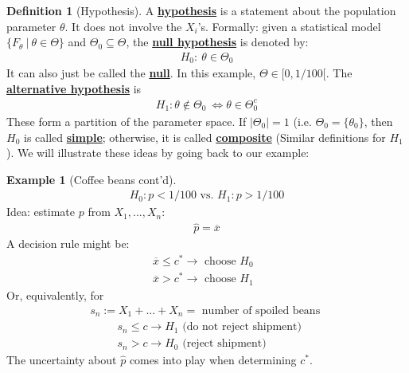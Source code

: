 \documentclass[11pt]{scrartcl}
\theoremstyle{definition}
\newtheorem{definition}{Definition}
\newtheorem{ex}{Example}
\theoremstyle{remark}
\newcommand{\dfn}[1]{\textbf{\underline{#1}}}
\begin{document}
{\begin{definition}[Hypothesis]
	A \dfn{hypothesis} is a statement about the population parameter $\theta$. It does not involve the $X_i$'s. Formally: given a statistical model $\{ F_\theta\ |\ \theta \in \Theta \}$ and $\Theta_0 \subseteq \Theta$, the \dfn{null hypothesis} is denoted by: 
	\begin{align*}
		H_0:\ \theta \in \Theta_0 
	\end{align*}
	It can also just be called the \dfn{null}. In this example, $\Theta \in [0, 1/100[$. The \dfn{alternative hypothesis} is 
	\begin{align*}
		H_1: \theta \notin \Theta_0\ \iff \theta \in \Theta_0^c 
	\end{align*}
	These form a partition of the parameter space. If $| \Theta_0 | =1$ (i.e. $\Theta_0 = \{ \theta_0 \}$, then $H_0$ is called \dfn{simple}; otherwise, it is called \dfn{composite} (Similar definitions for $H_1$). We will illustrate these ideas by going back to our example: 
\end{definition}

\begin{ex}[Coffee beans cont'd] 
	\begin{align*}
		H_0: p < 1/100 \text{ vs. } H_1: p > 1/100 	
	\end{align*}
	Idea: estimate $p$ from $X_1, ..., X_n$: 
	\begin{align*}
		\hat{p} = \overline{x} 
	\end{align*}
	A decision rule might be: 
	\begin{align*}
		\overline{x} \leq c^*  \rightarrow \text{ choose $H_0$ } \\
		\overline{x} > c^* \rightarrow \text{ choose $H_1$ } 
	\end{align*}
	Or, equivalently, for 
	\begin{align*}
		s_n := X_1 + ... + X_n = \text{ number of spoiled beans } 
	\end{align*}
	\begin{align*}
		& s_n \leq c \rightarrow H_1 \text{ (do not reject shipment) } \\
		& s_n > c \rightarrow H_0 \text{ (reject shipment) } 
	\end{align*}
	The uncertainty about $\hat{p}$ comes into play when determining $c^*$. 
\end{ex}

}
\end{document}
